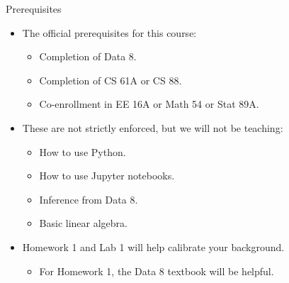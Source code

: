 \documentclass[aspectratio=169]{../latex_main/tntbeamer}  %
\begin{document}
	\begin{frame}{Prerequisites}
	    \begin{itemize}
	        \item The official prerequisites for this course:
	        \begin{itemize}
	            \item Completion of Data 8.
	            \item Completion of CS 61A or CS 88.
	            \item Co-enrollment in EE 16A or Math 54 or Stat 89A.
	        \end{itemize}
	        \item These are not strictly enforced, but we will not be teaching:
	        \begin{itemize}
	            \item How to use Python.
	            \item How to use Jupyter notebooks.
	            \item Inference from Data 8.
	            \item Basic linear algebra.
	        \end{itemize}
	        \item Homework 1 and Lab 1 will help calibrate your background.
	        \begin{itemize}
	            \item For Homework 1, the Data 8 textbook will be helpful.
	        \end{itemize}
	    \end{itemize}
	\end{frame}
	
\end{document}
